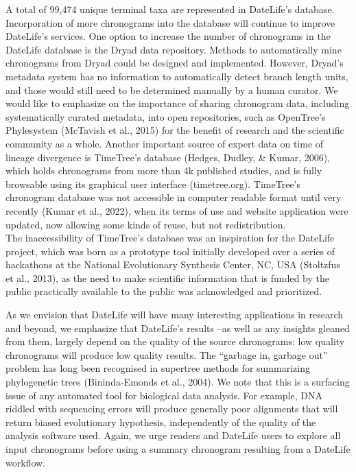 \documentclass[english,man]{apa6}
\begin{document}
A total of 99,474 unique terminal taxa are represented in DateLife's database.
Incorporation of more chronograms into the database will continue to improve DateLife's services. One option to increase the number of chronograms in the DateLife database is the Dryad data repository. Methods to automatically mine chronograms from Dryad could be designed and implemented. However, Dryad's metadata system has no information to automatically detect branch length units, and those would still need to be determined manually by a human curator.
We would like to emphasize on the importance of sharing chronogram data, including systematically curated metadata, into open repositories, such as OpenTree's Phylesystem (McTavish et al., 2015) for the benefit of research and the scientific community as a whole.
Another important source of expert data on time of lineage divergence is TimeTree's database (Hedges, Dudley, \& Kumar, 2006), which holds chronograms from more than 4k published studies, and is fully browsable using its graphical user interface (timetree.org). TimeTree's chronogram database was not accessible in computer readable format until very recently (Kumar et al., 2022), when its terms of use and website application were updated, now allowing some kinds of reuse, but not redistribution.\\
 The inaccessibility of TimeTree's database was an inspiration for the DateLife project, which was born as a prototype tool initially developed over a series of hackathons at the National Evolutionary Synthesis Center, NC, USA (Stoltzfus et al., 2013), as the need to make scientific information that is funded by the public practically available to the public was acknowledged and prioritized.

As we envision that DateLife will have many interesting applications in research and beyond, we emphasize that DateLife's results --as well as any insights gleaned from them, largely depend on the quality of the source chronograms: low quality chronograms will produce low quality results. The \enquote{garbage in, garbage out} problem has long been recognised in supertree methods for summarizing phylogenetic trees (Bininda-Emonds et al., 2004).
We note that this is a surfacing issue of any automated tool for biological data analysis. For example, DNA riddled with sequencing errors will produce generally poor alignments that will return biased evolutionary hypothesis, independently of the quality of the analysis software used. Again, we urge readers and DateLife users to explore all input chronograms before using a summary chronogram resulting from a DateLife workflow.
\end{document}

